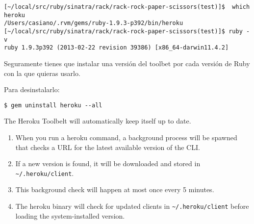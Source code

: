 \begin{verbatim}
[~/local/src/ruby/sinatra/rack/rack-rock-paper-scissors(test)]$  which heroku
/Users/casiano/.rvm/gems/ruby-1.9.3-p392/bin/heroku
[~/local/src/ruby/sinatra/rack/rack-rock-paper-scissors(test)]$ ruby -v
ruby 1.9.3p392 (2013-02-22 revision 39386) [x86_64-darwin11.4.2]
\end{verbatim}
Seguramente tienes que instalar una versión del toolbet por cada versión de Ruby con la que quieras usarlo.

Para desinstalarlo:
\begin{verbatim}
$ gem uninstall heroku --all
\end{verbatim}

The Heroku Toolbelt will automatically keep itself up to date.

\begin{enumerate}
\item 
When you run a heroku command, a background process will be spawned
that checks a URL for the latest available version of the CLI. 
\item 
If
a new version is found, it will be downloaded and stored in
\verb|~/.heroku/client|. 
\item 
This background check will happen at most once
every 5 minutes.
\item 
The heroku binary will check for updated clients in \verb|~/.heroku/client|
before loading the system-installed version.
\end{enumerate}


